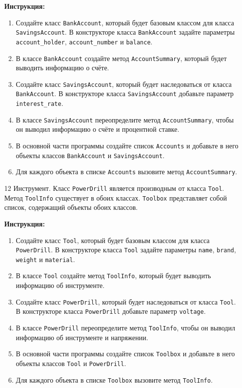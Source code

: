 \begin{enumerate}
\textbf{Инструкция:}
\begin{enumerate}
    \item Создайте класс \texttt{BankAccount}, который будет базовым классом для класса \texttt{SavingsAccount}. В конструкторе класса \texttt{BankAccount} задайте параметры \texttt{account\_holder}, \texttt{account\_number} и \texttt{balance}.
    \item В классе \texttt{BankAccount} создайте метод \texttt{AccountSummary}, который будет выводить информацию о счёте.
    \item Создайте класс \texttt{SavingsAccount}, который будет наследоваться от класса \texttt{BankAccount}. В конструкторе класса \texttt{SavingsAccount} добавьте параметр \texttt{interest\_rate}.
    \item В классе \texttt{SavingsAccount} переопределите метод \texttt{AccountSummary}, чтобы он выводил информацию о счёте и процентной ставке.
    \item В основной части программы создайте список \texttt{Accounts} и добавьте в него объекты классов \texttt{BankAccount} и \texttt{SavingsAccount}.
    \item Для каждого объекта в списке \texttt{Accounts} вызовите метод \texttt{AccountSummary}.
\end{enumerate}

\item[12]
Инструмент. Класс \texttt{PowerDrill} является производным от класса \texttt{Tool}. Метод \texttt{ToolInfo} существует в обоих классах. \texttt{Toolbox} представляет собой список, содержащий объекты обоих классов.

\textbf{Инструкция:}
\begin{enumerate}
    \item Создайте класс \texttt{Tool}, который будет базовым классом для класса \texttt{PowerDrill}. В конструкторе класса \texttt{Tool} задайте параметры \texttt{name}, \texttt{brand}, \texttt{weight} и \texttt{material}.
    \item В классе \texttt{Tool} создайте метод \texttt{ToolInfo}, который будет выводить информацию об инструменте.
    \item Создайте класс \texttt{PowerDrill}, который будет наследоваться от класса \texttt{Tool}. В конструкторе класса \texttt{PowerDrill} добавьте параметр \texttt{voltage}.
    \item В классе \texttt{PowerDrill} переопределите метод \texttt{ToolInfo}, чтобы он выводил информацию об инструменте и напряжении.
    \item В основной части программы создайте список \texttt{Toolbox} и добавьте в него объекты классов \texttt{Tool} и \texttt{PowerDrill}.
    \item Для каждого объекта в списке \texttt{Toolbox} вызовите метод \texttt{ToolInfo}.
\end{enumerate}


\end{enumerate}
